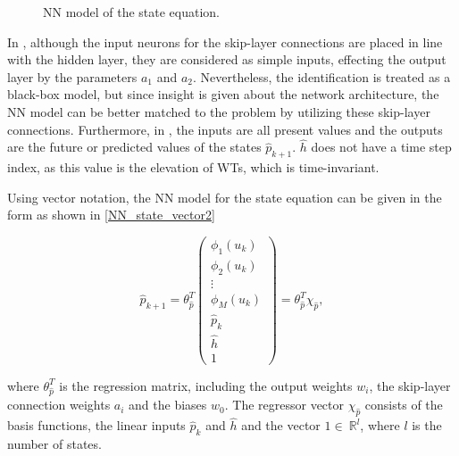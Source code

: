  \begin{figure}[H]
 \centering
  
 \caption{NN model of the state equation.}
 \label{fig:nn_state}
 \end{figure}

 \vspace{-3mm}

 In , although the input neurons for the skip-layer connections are placed in line with the hidden layer, they are considered as simple inputs, effecting the output layer by the parameters $a_1$ and $a_2$. Nevertheless, the identification is treated as a black-box model, but since insight is given about the network architecture, the NN model can be better matched to the problem by utilizing these skip-layer connections. Furthermore, in , the inputs are all present values and the outputs are the future or predicted values of the states $\hat{p}_{k+1}$. $\hat{h}$ does not have a time step index, as this value is the elevation of WTs, which is time-invariant. 

 Using vector notation, the NN model for the state equation can be given in the form as shown in \eqref{NN_state_vector2}

  \begin{equation}
\label{NN_state_vector2}
\hat{p}_{k+1} = \theta^T_{\hat{p}} 
          \begin{pmatrix}
           \phi_1(u_k) \\[1pt]
           \phi_2(u_k) \\[1pt]
           \vdots \\[1pt]
           \phi_M(u_k)\\[3pt]
           \hat{p}_k \\
           \hat{h}\\
           1 
         \end{pmatrix}
         =
         \theta^T_{\hat{p}} \chi_{\hat{p}},
\end{equation}

where $\theta^T_{\hat{p}}$ is the regression matrix, including the output weights $w_i$, the skip-layer connection weights $a_i$ and the biases $w_0$. The regressor vector $\chi_{\hat{p}}$ consists of the basis functions, the linear inputs $\hat{p}_k$ and $\hat{h}$ and the vector $1 \in \: \mathbb{R}^{l} $, where $l$ is the number of states.




